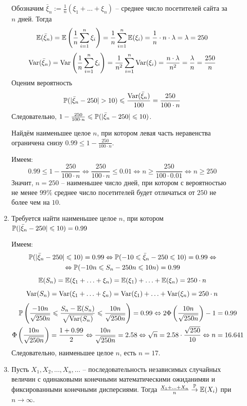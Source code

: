 \begin{enumerate}
\begin{enumerate}
Обозначим $\bar{\xi}_n := \frac{1}{n} \left(\xi_1 + \ldots + \xi_n\right)$ – среднее число посетителей сайта за $n$ дней. Тогда
\[
\E(\bar{\xi}_n) = \E\left(\frac{1}{n} \sum_{i=1}^{n} \xi_i\right) = \frac{1}{n} \sum_{i=1}^{n} \E(\xi_i) = \frac{1}{n} \cdot n \cdot \lambda = \lambda = 250
\]
\[
\Var(\bar{\xi}_n) = \Var\left(\frac{1}{n} \sum_{i=1}^{n} \xi_i\right) = \frac{1}{n^2} \sum_{i=1}^{n} \Var (\xi_i) = \frac{n \cdot \lambda}{n^2} = \frac{\lambda}{n} = \frac{250}{n}
\]
Оценим вероятность
\[
\P(\vert\bar{\xi}_n-250\vert > 10) \leq \frac{\Var(\bar{\xi}_n)}{100} = \frac{250}{100\cdot n}
\]
Следовательно, $1 - \frac{250}{100\cdot n} \leq \P(\vert\bar{\xi}_n-250\vert \leq 10)$.

Найдём наименьшее целое $n$, при котором левая часть неравенства ограничена снизу $0.99 \leq 1 - \frac{250}{100\cdot n}$.

Имеем:
\[
0.99 \leq 1 - \frac{250}{100\cdot n} \Leftrightarrow \frac{250}{100\cdot n} \leq 0.01 \Leftrightarrow n \geq \frac{250}{100 \cdot 0.01} \Leftrightarrow n  \geq 250
\]
Значит, $n=250$ – наименьшее число дней, при котором с вероятностью не менее $99\%$ среднее число посетителей будет отличаться от $250$ не более чем на $10$.
\item  Требуется найти наименьшее целое $n$, при котором $\P(\vert\bar{\xi}_n-250\vert \leq 10)=0.99$

Имеем:
\begin{multline*}
\P(\vert\bar{\xi}_n-250\vert \leq 10)=0.99 \Leftrightarrow \P(-10\leq \bar{\xi}_n -250 \leq 10) =0.99 \Leftrightarrow \\
\Leftrightarrow  \P(-10n \leq S_n-250n \leq 10n) =0.99
\end{multline*}
\[
\E(S_n) = \E(\xi_1 + \ldots + \xi_n) = \E(\xi_1) + \ldots + \E(\xi_n) = 250\cdot n
\]
\[
\Var(S_n) = \Var(\xi_1 + \ldots + \xi_n) = \Var(\xi_1) + \ldots + \Var(\xi_n) = 250 \cdot n
\]
\begin{multline*}
\P\left(\frac{-10n}{\sqrt{250n}} \leq \frac{S_n - \E (S_n)}{\sqrt{\Var(S_n)}} \leq \frac{10n}{\sqrt{250n}}\right) =0.99 \Leftrightarrow 2 \Phi \left(\frac{10n}{\sqrt{250n}}\right) -1 = 0.99 \\
\Phi \left(\frac{10n}{\sqrt{250n}}\right) = \frac{1 + 0.99}{2} \Leftrightarrow \frac{10n}{\sqrt{250n}} = 2.58 \Leftrightarrow \sqrt{n} = 2.58 \cdot \frac{\sqrt{250}}{10} \Leftrightarrow n = 16.641
\end{multline*}
Следовательно, наименьшее целое $n$, есть $n=17$.
\item Пусть $X_1, X_2, \ldots, X_n, \ldots$ – последовательность независимых случайных величин с одинаковыми конечными математическими ожиданимяи и фиксированными конечными дисперсиями. Тогда $\frac{X_1 + \ldots + X_n}{n} \stackrel{\P}{\to} \E(X_i)$ при $n \to \infty$.


\end{enumerate}
\end{enumerate}
